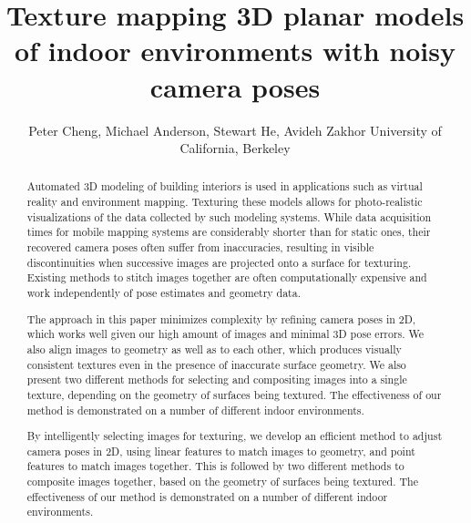 \documentclass[]{spie}  %
\title{Texture mapping 3D planar models of indoor environments with noisy camera poses}
\author{Peter Cheng, Michael Anderson, Stewart He, Avideh Zakhor
\skiplinehalf
University of California, Berkeley\\
}
\begin{document}
\maketitle

\begin{abstract}
  Automated 3D modeling of building interiors is used in applications
  such as virtual reality and environment mapping. Texturing these
  models allows for photo-realistic visualizations of the data
  collected by such modeling systems. While data acquisition times for mobile mapping systems are considerably shorter than for static ones, their recovered camera poses often suffer from inaccuracies, resulting in visible discontinuities when successive images
  are projected onto a surface for texturing. Existing methods to
  stitch images together are often computationally expensive and work
  independently of pose estimates and geometry data. 

The approach in this paper minimizes complexity by refining camera poses in 2D, which works well given our high amount of images and minimal 3D pose errors. We also align images to geometry as well as to each other, which produces visually consistent textures even in the presence of inaccurate surface geometry. We also present two different methods for selecting and compositing images into a single texture, depending on the geometry of surfaces being textured. The effectiveness of our method is demonstrated on a number of different indoor environments.


By
  intelligently selecting images for texturing, we develop an
  efficient method to adjust camera poses in 2D, using linear features
  to match images to geometry, and point features to match images
  together. This is followed by two different methods to composite
  images together, based on the geometry of surfaces being
  textured. The effectiveness of our method is demonstrated on a
  number of different indoor environments.
\end{abstract}



\end{document}
